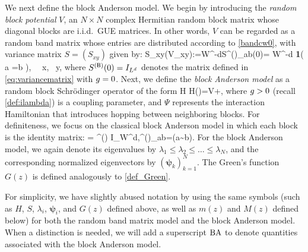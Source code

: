 We next define the block Anderson model. We begin by introducing the \emph{random block potential} $V$, an $N\times N$ complex Hermitian random block matrix whose diagonal blocks are i.i.d.~GUE matrices. In other words, $V$ can be regarded as a random band matrix whose entries are distributed according to \eqref{bandcw0}, with variance matrix $S=(S_{xy})$ given by: 
\be\label{bandcwV}
S_{xy}\equiv \var (V_{xy}):=W^{-d}S^{(\sB)}_{ab}(0)= W^{-d} {\bf 1}\left( a =b \right), \quad {} \ \  x\in [a], \ y\in [b],
\ee
where \( S^{({\mathsf{B}})}(0)=I_{L^d} \) denotes the matrix defined in \eqref{eq:variancematrix} with $g=0$. 
Next, we define the \emph{block Anderson model} as a random block Schr{\"o}dinger operator of the form
\be\label{eq:H_blocka}
H \equiv H(\ilambda)=V+\ilambda \Psi ,\ee 
where $g>0$ (recall \eqref{def:ilambda}) is a coupling parameter, and $\Psi$ represents the interaction Hamiltonian that introduces hopping between neighboring blocks. 
For definiteness, we focus on the classical block Anderson model in which each block is the identity matrix: %
\be\label{eq:Psi3D}
\Psi= \Psi^{(\sB)}\otimes
    I_{W^d},\quad {}\quad  \Psi^{(\sB)}_{ab}=(a\sim b).\ee 
For the block Anderson model, we again denote its eigenvalues by \( \lambda_1 \leq \lambda_2 \leq \dots \leq \lambda_N \), and the corresponding normalized eigenvectors by \( \left( \boldsymbol{\psi}_k \right)_{k=1}^N \). 
The Green's function $G(z)$ is defined analogously to \eqref{def_Green}. 
\begin{remark}
For simplicity, we have slightly abused notation by using the same symbols (such as $H$, $S$, $\lambda_i$, $\boldsymbol{\psi}_i$, and $G(z)$ defined above, as well as $m(z)$ and $M(z)$ defined below) for both the random band matrix model and the block Anderson model. When a distinction is needed, we will add a superscript $\mathrm{BA}$ to denote quantities associated with the block Anderson model.
\end{remark}    

